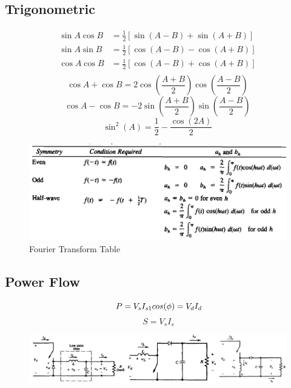 \documentclass[twocolumn, ]{article}
\begin{document}
\subsection*{  Trigonometric }

\begin{align*}
          \sin A \cos B &= \frac{1}{2}\left[ \sin(A-B)+\sin(A+B) \right] \\
          \sin A \sin B &= \frac{1}{2}\left[ \cos(A-B)-\cos(A+B) \right] \\
          \cos A \cos B &= \frac{1}{2}\left[ \cos(A-B)+\cos(A+B) \right] \\     
\end{align*}  
\begin{equation*}
	  \cos A +\cos B = 2\cos(\frac{A+B}{2})\cos(\frac{A-B}{2})
\end{equation*}
\begin{equation*}
	  \cos A -\cos B = -2\sin(\frac{A+B}{2})\sin(\frac{A-B}{2})
\end{equation*}
\begin{equation*}
	\sin^2(A)=\frac{1}{2}-\frac{\cos(2A)}{2}
\end{equation*}
  \begin{figure}[!ht]
	\includegraphics[scale=0.35]{Fourier.png}
	\caption{Fourier Transform Table}
\end{figure}

\subsection*{\small Power Flow}
\begin{equation*}
	\ P=V_{s}I_{s1}cos(\phi)=V_{d}I_{d}\\	
\end{equation*}
\begin{equation*}
	\ S=V_{s}I_{s}	
\end{equation*}

\begin{figure}[!ht]
	\includegraphics[scale=0.3]{buck_boost.jpg}
\end{figure}
\end{document}
